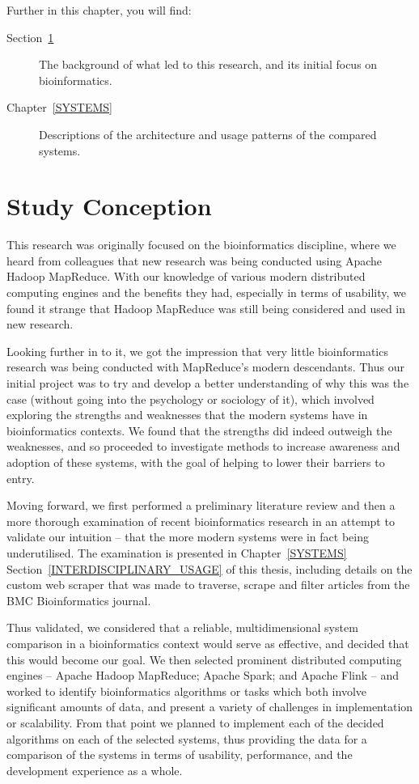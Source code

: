   Further in this chapter, you will find:
  
  \begin{description}
    \item [Section~\ref{STUDY_CONCEPTION}] The background of what led to this research, and its initial focus on bioinformatics.
    \item [Chapter~\ref{SYSTEMS}] Descriptions of the architecture and usage patterns of the compared systems.
  \end{description}
  

\section{Study Conception}
\label{STUDY_CONCEPTION}

  This research was originally focused on the bioinformatics discipline, where we heard from colleagues that new research was being conducted using Apache Hadoop MapReduce. With our knowledge of various modern distributed computing engines and the benefits they had, especially in terms of usability, we found it strange that Hadoop MapReduce was still being considered and used in new research.
  
  Looking further in to it, we got the impression that very little bioinformatics research was being conducted with MapReduce's modern descendants. Thus our initial project was to try and develop a better understanding of why this was the case (without going into the psychology or sociology of it), which involved exploring the strengths and weaknesses that the modern systems have in bioinformatics contexts. We found that the strengths did indeed outweigh the weaknesses, and so proceeded to investigate methods to increase awareness and adoption of these systems, with the goal of helping to lower their barriers to entry.
  
  Moving forward, we first performed a preliminary literature review and then a more thorough examination of recent bioinformatics research in an attempt to validate our intuition -- that the more modern systems were in fact being underutilised. The examination is presented in Chapter~\ref{SYSTEMS} Section~\ref{INTERDISCIPLINARY_USAGE} of this thesis, including details on the custom web scraper that was made to traverse, scrape and filter articles from the BMC Bioinformatics journal.
  
  Thus validated, we considered that a reliable, multidimensional system comparison in a bioinformatics context would serve as effective, and decided that this would become our goal. We then selected prominent distributed computing engines -- Apache Hadoop MapReduce; Apache Spark; and Apache Flink -- and worked to identify bioinformatics algorithms or tasks which both involve significant amounts of data, and present a variety of challenges in implementation or scalability. From that point we planned to implement each of the decided algorithms on each of the selected systems, thus providing the data for a comparison of the systems in terms of usability, performance, and the development experience as a whole.
  
